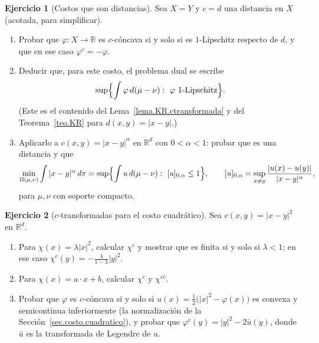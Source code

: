 \documentclass[12pt, a4paper]{amsbook}
\newcommand{\R}{{\mathbb R}}
\theoremstyle{remark}
\theoremstyle{definition}
\newtheorem{ejercicio}{Ejercicio}[chapter]
\numberwithin{section}{chapter}
\numberwithin{subsection}{section}
\numberwithin{equation}{section}
\numberwithin{figure}{chapter}
\begin{document}
\begin{ejercicio}[Costos que son distancias]\label{ejer.ctransf.distancia}
Sea $X=Y$ y $c=d$ una distancia en $X$ (acotada, para simplificar).
\begin{enumerate}[label=(\alph*)]
\item Probar que $\varphi\colon X\to\R$ es $c$-cóncava si y solo si es
$1$-Lipschitz respecto de $d$, y que en ese caso $\varphi^c=-\varphi$.
\item Deducir que, para este costo, el problema dual se escribe
\[
\sup\Bigl\{\int\varphi\,d(\mu-\nu):\ \varphi\ \text{$1$-Lipschitz}\Bigr\}.
\]
(Este es el contenido del Lema~\ref{lema.KR.ctransformada} y del
Teorema~\ref{teo.KR} para $d(x,y)=|x-y|$.)
\item Aplicarlo a $c(x,y)=|x-y|^\alpha$ en $\R^d$ con $0<\alpha<1$: probar
que es una distancia y que
\[
\min_{\Pi(\mu,\nu)}\int|x-y|^\alpha\,d\pi
=\sup\Bigl\{\int u\,d(\mu-\nu):\ [u]_{0,\alpha}\le1\Bigr\},
\qquad
[u]_{0,\alpha}=\sup_{x\ne y}\frac{|u(x)-u(y)|}{|x-y|^\alpha},
\]
para $\mu,\nu$ con soporte compacto.
\end{enumerate}
\end{ejercicio}

\begin{ejercicio}[$c$-transformadas para el costo cuadrático]\label{ejer.ctransf.cuadratico}
Sea $c(x,y)=|x-y|^2$ en $\R^d$.
\begin{enumerate}[label=(\alph*)]
\item Para $\chi(x)=\lambda|x|^2$, calcular $\chi^c$ y mostrar que es finita
si y solo si $\lambda<1$; en ese caso $\chi^c(y)=-\frac{\lambda}{1-\lambda}|y|^2$.
\item Para $\chi(x)=a\cdot x+b$, calcular $\chi^c$ y $\chi^{c\bar c}$.
\item Probar que $\varphi$ es $c$-cóncava si y solo si
$u(x)=\frac12\bigl(|x|^2-\varphi(x)\bigr)$ es convexa y semicontinua
inferiormente (la normalización de la Sección~\ref{sec.costo.cuadratico}), y
probar que $\varphi^c(y)=|y|^2-2\bar u(y)$, donde $\bar u$ es la
transformada de Legendre de $u$.
\end{enumerate}
\end{ejercicio}
\end{document}
